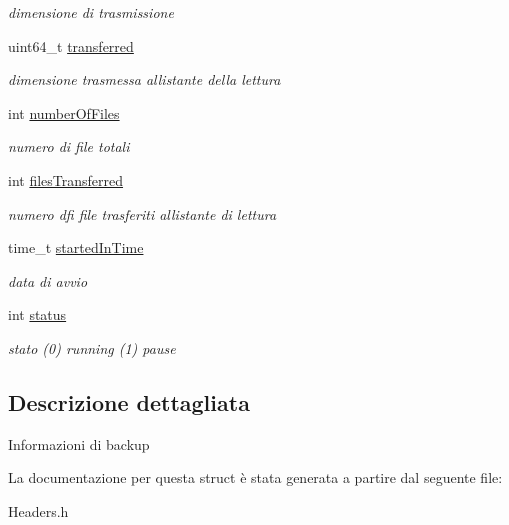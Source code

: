 \begin{DoxyCompactItemize}
\begin{DoxyCompactList}\small\item\em dimensione di trasmissione \end{DoxyCompactList}\item 
uint64\+\_\+t \hyperlink{structbackupThread_afcd8016a65446a70e5dac7fb2ba68ff4}{transferred}\hypertarget{structbackupThread_afcd8016a65446a70e5dac7fb2ba68ff4}{}\label{structbackupThread_afcd8016a65446a70e5dac7fb2ba68ff4}

\begin{DoxyCompactList}\small\item\em dimensione trasmessa all\textquotesingle{}istante della lettura \end{DoxyCompactList}\item 
int \hyperlink{structbackupThread_adbc1707de024513829e065bc13478db4}{number\+Of\+Files}\hypertarget{structbackupThread_adbc1707de024513829e065bc13478db4}{}\label{structbackupThread_adbc1707de024513829e065bc13478db4}

\begin{DoxyCompactList}\small\item\em numero di file totali \end{DoxyCompactList}\item 
int \hyperlink{structbackupThread_a1d6e777adc42fc47ea8ddd2de429b373}{files\+Transferred}\hypertarget{structbackupThread_a1d6e777adc42fc47ea8ddd2de429b373}{}\label{structbackupThread_a1d6e777adc42fc47ea8ddd2de429b373}

\begin{DoxyCompactList}\small\item\em numero dfi file trasferiti all\textquotesingle{}istante di lettura \end{DoxyCompactList}\item 
time\+\_\+t \hyperlink{structbackupThread_a58f4590be123ad5e1fcb6392c819f238}{started\+In\+Time}\hypertarget{structbackupThread_a58f4590be123ad5e1fcb6392c819f238}{}\label{structbackupThread_a58f4590be123ad5e1fcb6392c819f238}

\begin{DoxyCompactList}\small\item\em data di avvio \end{DoxyCompactList}\item 
int \hyperlink{structbackupThread_a6053c4356404cdc9aaf5593d8b1a8bb5}{status}\hypertarget{structbackupThread_a6053c4356404cdc9aaf5593d8b1a8bb5}{}\label{structbackupThread_a6053c4356404cdc9aaf5593d8b1a8bb5}

\begin{DoxyCompactList}\small\item\em stato (0) running (1) pause \end{DoxyCompactList}\end{DoxyCompactItemize}


\subsection{Descrizione dettagliata}
Informazioni di backup 

La documentazione per questa struct è stata generata a partire dal seguente file\+:\begin{DoxyCompactItemize}
\item 
Headers.\+h\end{DoxyCompactItemize}

